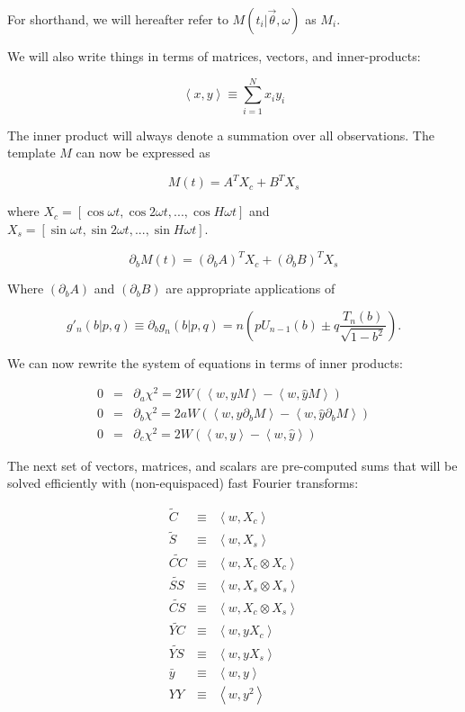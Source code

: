 \documentclass[notitlepage]{article}
\newcommand{\Cc}[1][n]{\widetilde{C}}
\newcommand{\Ss}[1][n]{\widetilde{S}}
\newcommand{\CCc}[1][nm]{\widetilde{CC}}
\newcommand{\SSs}[1][nm]{\widetilde{SS}}
\newcommand{\CS}[1][nm]{\widetilde{CS}}
\newcommand{\YC}[1][n]{\widetilde{YC}}
\newcommand{\YS}[1][n]{\widetilde{YS}}
\newcommand{\Xs}{X_s}
\newcommand{\Xc}{X_c}
\newcommand{\Ybar}{\bar{y}}
\newcommand{\YY}{YY}
\newcommand{\dM}{\partial_bM}
\newcommand{\iprod}[2]{\left<#1, #2\right>}
\newcommand{\oprod}[2]{#1 \otimes #2}
\newcommand{\dA}{(\partial_b A)}
\newcommand{\dB}{(\partial_b B)}
\begin{document}
For shorthand, we will hereafter refer to $M(t_i|\vec{\theta}, \omega)$ as $M_i$.

We will also write things in terms of matrices, vectors, and inner-products:

\begin{equation}
\iprod{x}{y} \equiv \sum_{i=1}^N x_i y_i
\end{equation}

The inner product will always denote a summation over all observations. The
template $M$ can now be expressed as

\begin{equation}
M(t) = A^T\Xc + B^T\Xs
\end{equation}

where $\Xc = \left[\cos{\omega t}, \cos{2\omega t}, ..., \cos{H\omega t} \right]$ and
$\Xs = \left[\sin{\omega t}, \sin{2\omega t}, ..., \sin{H\omega t}\right]$.

\begin{equation}
\partial_bM(t) = \dA^T\Xc + \dB^T\Xs
\end{equation}

Where $\dA$ and $\dB$ are appropriate applications of

\begin{equation}
g'_n(b|p, q) \equiv \partial_b g_n(b|p, q) = n\left(pU_{n-1}(b) \pm q\frac{T_n(b)}{\sqrt{1 - b^2}}\right).
\end{equation}

We can now rewrite the system of equations in terms of inner products:

\begin{eqnarray}
0 &=& \partial_{a} \chi^2 = 2W\left(\iprod{w}{yM} - \iprod{w}{\hat{y}M}\right)\\
0 &=& \partial_{b} \chi^2 = 2aW\left(\iprod{w}{y\dM} - \iprod{w}{\hat{y}\dM}\right)\\
0 &=& \partial_{c} \chi^2 = 2W\left(\iprod{w}{y} - \iprod{w}{\hat{y}}\right)
\end{eqnarray}

The next set of vectors, matrices, and scalars are pre-computed sums that will be solved efficiently with (non-equispaced) fast Fourier transforms:

\begin{eqnarray}
\Cc   &\equiv& \iprod{w}{\Xc}\\
\Ss   &\equiv& \iprod{w}{\Xs}\\
\CCc &\equiv& \iprod{w}{\oprod{\Xc}{\Xc}}\\
\SSs &\equiv& \iprod{w}{\oprod{\Xs}{\Xs}}\\
\CS &\equiv&  \iprod{w}{\oprod{\Xc}{\Xs}}\\
\YC  &\equiv& \iprod{w}{y\Xc}\\
\YS  &\equiv& \iprod{w}{y\Xs}\\
\Ybar &\equiv& \iprod{w}{y}\\
\YY &\equiv& \iprod{w}{y^2}
\end{eqnarray}
\end{document}
